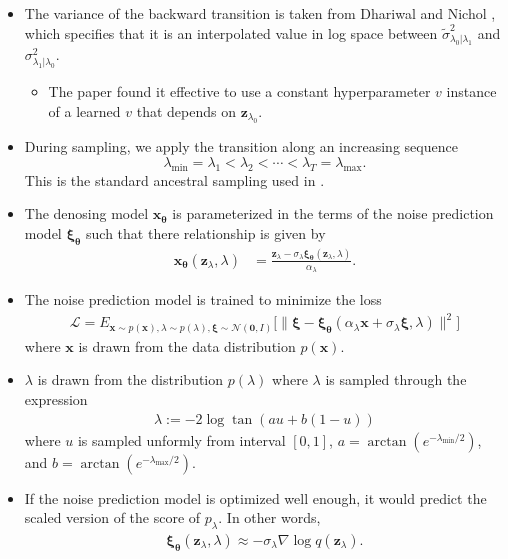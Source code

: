 \documentclass[10pt]{article}
\newcommand{\ve}[1]{\mathbf{#1}}
\newcommand{\ves}[1]{\boldsymbol{#1}}
\newcommand{\mcal}[1]{\mathcal{#1}}
\newcommand{\N}{\mathcal{N}}
\begin{document}
\begin{itemize}
\begin{itemize}
    \item The variance of the backward transition is taken from Dhariwal and Nichol \cite{Dhariwal:2021}, which specifies that it is an interpolated value in log space between $\widetilde{\sigma}^2_{\lambda_0|\lambda_1}$ and $\sigma^2_{\lambda_1|\lambda_0}$.\
    \begin{itemize}
      \item The paper found it effective to use a constant hyperparameter $v$ instance of a learned $v$ that depends on $\ve{z}_{\lambda_0}$.
    \end{itemize}

    \item During sampling, we apply the transition along an increasing sequence $$\lambda_{\min} = \lambda_1 < \lambda_2 < \dotsb < \lambda_T = \lambda_{\max}.$$
    This is the standard ancestral sampling used in \cite{Ho:2020}.

    \item The denosing model $\ve{x}_{\ves{\theta}}$ is parameterized in the terms of the noise prediction model $\ves{\xi}_{\ves{\theta}}$ such that there relationship is given by
    \begin{align*}
      \ve{x}_{\ves{\theta}}(\ve{z}_{\lambda}, \lambda)
      &= \frac{\ve{z}_\lambda - \sigma_\lambda \ves{\xi}_{\ves{\theta}}(\ve{z}_\lambda, \lambda)}{\alpha_\lambda}.
    \end{align*}

    \item The noise prediction model is trained to minimize the loss
    \begin{align*}
      \mcal{L} = E_{\ve{x} \sim p(\ve{x}), \lambda \sim p(\lambda), \ves{\xi} \sim \N(\ve{0},I)} \big[
        \| \ves{\xi} - \ves{\xi}_{\ves{\theta}}(\alpha_\lambda \ve{x} + \sigma_\lambda \ves{\xi}, \lambda) \|^2
      \big]
    \end{align*}
    where $\ve{x}$ is drawn from the data distribution $p(\ve{x})$. 
    
    \item $\lambda$ is drawn from the distribution $p(\lambda)$ where $\lambda$ is sampled through the expression
    \begin{align*}
      \lambda := -2 \log \tan(au + b(1-u))
    \end{align*}
    where $u$ is sampled unformly from interval $[0,1]$, $a = \arctan(e^{-\lambda_{\min}/2})$, and $b = \arctan(e^{-\lambda_{\max}/2})$.

    \item If the noise prediction model is optimized well enough, it would predict the scaled version of the score of $p_{\lambda}$. In other words,
    \begin{align*}
      \ves{\xi}_{\ves{\theta}}(\ve{z}_{\lambda}, \lambda) \approx -\sigma_\lambda \nabla \log q(\ve{z}_\lambda).
    \end{align*}
  \end{itemize}  


\end{itemize}
\end{document}
